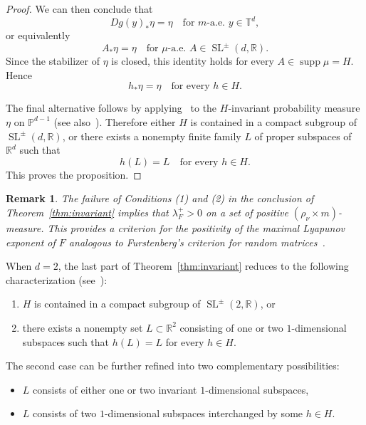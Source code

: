 \documentclass[a4paper,12pt,reqno]{amsart}
\numberwithin{equation}{section}
\newtheorem{remark}[theorem]{Remark}
\newcommand{\Rr}{{\mathbb{R}}}
\newcommand{\Tt}{{\mathbb{T}}}
\def\SL{\operatorname{SL}}
\def\supp{\operatorname{supp}}
\begin{document}
\begin{proof}
We can then conclude that
\[
Dg(y)_*\eta=\eta
\quad\text{for }m\text{-a.e. }y\in\Tt^d,
\]
or equivalently
\[
A_*\eta=\eta
\quad\text{for }\mu\text{-a.e. }A\in\SL^{\pm}(d,\Rr).
\]
Since the stabilizer of $\eta$ is closed, this identity holds for every
$A\in\supp\mu=H$. Hence
\[
h_*\eta=\eta
\quad\text{for every }h\in H.
\]

The final alternative follows by applying~\cite[Corollary~3.2.2]{zimmer} to the $H$-invariant probability measure $\eta$ on $\mathbb P^{d-1}$ (see also~\cite[Section~7.3]{Viana:2014uo}). Therefore either
$H$ is contained in a compact subgroup of $\SL^{\pm}(d,\Rr)$, or there exists a
nonempty finite family $L$ of proper subspaces of $\Rr^d$ such that
\[
h(L)=L
\quad\text{for every }h\in H.
\]
This proves the proposition.
\end{proof}

\begin{remark} \label{remark:hyp-ell}
The failure of Conditions (1) and (2) in the conclusion of Theorem~\ref{thm:invariant} implies that $\lambda^+_F > 0$ on a set of positive $(\rho_\nu \times m)$-measure. This provides a criterion for the positivity of the maximal Lyapunov exponent of $F$ analogous to Furstenberg's criterion for random matrices~\cite[Section~7.3]{Viana:2014uo}.
\end{remark}


When $d=2$, the last part of Theorem~\ref{thm:invariant} reduces to the following characterization (see~\cite[Section 6.3]{Viana:2014uo}):  
\begin{enumerate}
    \item $H$ is contained in a compact subgroup of $\SL^{\pm}(2,\mathbb{R})$, or  
    \item there exists a nonempty set $L\subset\mathbb{R}^2$ consisting of one or two $1$-dimensional subspaces such that $h(L)=L$ for every $h\in H$.
\end{enumerate}  
The second case can be further refined into two complementary possibilities:  
\begin{itemize}
    \item $L$ consists of either one or two invariant $1$-dimensional subspaces,
    \item $L$ consists of two $1$-dimensional subspaces interchanged by some $h \in H$.
\end{itemize}
\end{document}
